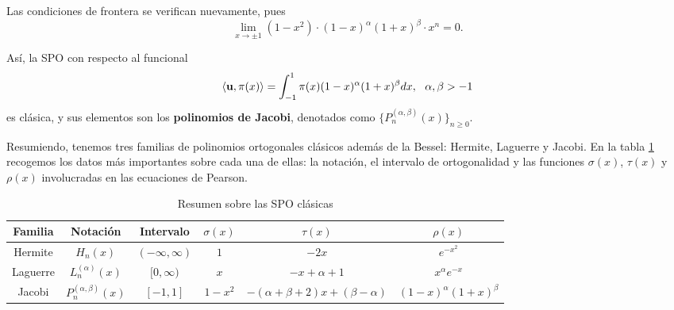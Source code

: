 Las condiciones de frontera se verifican nuevamente, pues $$\displaystyle\lim_{x\rightarrow \pm 1} (1-x^2)\cdot (1-x)^{\alpha}(1+x)^{\beta}\cdot x^n = 0.$$

Así, la SPO con respecto al funcional
\begin{equation}
    \label{eq:func-jacobi}
    \left\langle \mathbf{u} , \pi(x) \right\rangle = \int_{-1}^1 \pi(x)(1-x)^{\alpha}(1+x)^{\beta}dx, \ \ \alpha,\beta > -1
\end{equation}
es clásica, y sus elementos son los \textbf{polinomios de Jacobi}, denotados como $\{P_n^{(\alpha,\beta)}(x)\}_{n\geq 0}$.

\newpage

Resumiendo, tenemos tres familias de polinomios ortogonales clásicos además de la Bessel: Hermite, Laguerre y Jacobi. En la tabla \ref{tab:SPO-clasicas} recogemos los datos más importantes sobre cada una de ellas: la notación, el intervalo de ortogonalidad y las funciones $\sigma(x)$, $\tau(x)$ y $\rho(x)$ involucradas en las ecuaciones de Pearson.

\begin{table}[h]
    \centering
    \begin{tabular}{cccccc}
    \hline
    \textbf{Familia} & \textbf{Notación}         & \textbf{Intervalo} & \textbf{$\sigma(x)$} & \textbf{$\tau(x)$}                  & \textbf{$\rho(x)$}            \\ \hline\hline
    Hermite                        & $H_n(x)$                 & $(-\infty,\infty)$ & $1$                  & $-2x$                               & $e^{-x^2}$                    \\ \hline
    Laguerre                       & $L_n^{(\alpha)}(x)$       & $[0,\infty)$       & $x$                  & $-x+\alpha+1$                       & $x^{\alpha} e^{-x}$           \\ \hline
    Jacobi                         & $P_n^{(\alpha,\beta)}(x)$ & $[-1,1]$           & $1-x^2$              & $-(\alpha+\beta+2)x+(\beta-\alpha)$ & $(1-x)^{\alpha}(1+x)^{\beta}$ \\ \hline
    \end{tabular}
    \caption{Resumen sobre las SPO clásicas}
    \label{tab:SPO-clasicas}
\end{table}


